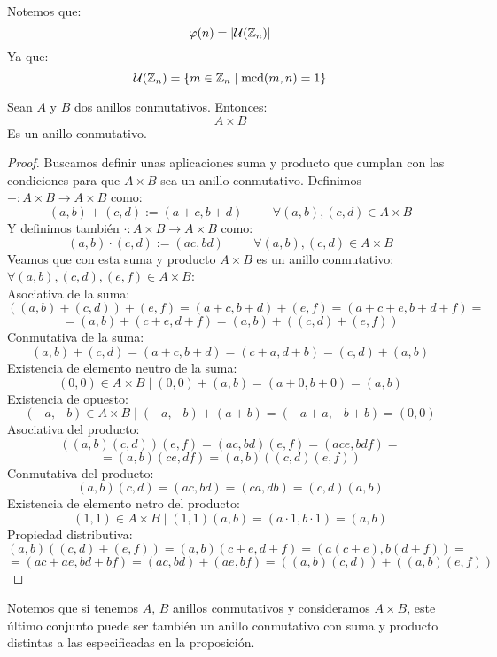 \bigskip

Notemos que:
$$\varphi(n) = |\mathcal{U}(\mathbb Z_n)|$$
Ya que:
$$\mathcal{U}(\mathbb Z_n) = \{m \in \mathbb Z_n \mid \operatorname{mcd}(m,n) = 1\}$$

\begin{prop}
    Sean $A$ y $B$ dos anillos conmutativos. Entonces:
    $$A \times B$$
    Es un anillo conmutativo.
\begin{proof}
    Buscamos definir unas aplicaciones suma y producto que cumplan con las condiciones para que $A \times B$ sea un anillo
    conmutativo.\newline
    Definimos $+:A\times B\rightarrow A\times B$ como:
    $$(a,b)+(c,d) := (a+c,b+d)\hspace{1cm}\forall (a,b),(c,d) \in A\times B$$
    Y definimos también $\cdot:A\times B\rightarrow A\times B$ como:
    $$(a,b)\cdot(c,d) := (ac, bd)\hspace{1cm}\forall (a,b),(c,d) \in A\times B$$
    Veamos que con esta suma y producto $A\times B$ es un anillo conmutativo: $\forall (a,b),(c,d),(e,f) \in A \times B$:\\

    
    Asociativa de la suma:
    $$((a,b)+(c,d))+(e,f) = (a+c,b+d)+(e,f) = (a+c+e,b+d+f) =$$
    $$=(a,b) + (c+e,d+f) = (a,b) + ((c,d)+(e,f))$$
    Conmutativa de la suma:
    $$(a,b)+(c,d) = (a+c,b+d) = (c+a,d+b) = (c,d)+(a,b)$$
    Existencia de elemento neutro de la suma:
    $$(0,0) \in A\times B \mid (0,0)+(a,b) = (a+0,b+0) = (a,b)$$
    Existencia de opuesto:
    $$(-a,-b) \in A\times B \mid (-a,-b)+(a+b) = (-a+a, -b+b) = (0,0)$$
    Asociativa del producto:
    $$((a,b)(c,d))(e,f) = (ac,bd)(e,f) = (ace,bdf) =$$
    $$=(a,b)(ce,df) = (a,b) ((c,d)(e,f))$$
    Conmutativa del producto:
    $$(a,b)(c,d) = (ac,bd) = (ca,db) = (c,d)(a,b)$$
    Existencia de elemento netro del producto:
    $$(1,1) \in A\times B \mid (1,1)(a,b) = (a\cdot 1, b\cdot 1) = (a,b)$$
    Propiedad distributiva:
    $$(a,b)((c,d)+(e,f)) = (a,b)(c+e,d+f) = (a(c+e),b(d+f)) =$$
    $$= (ac+ae,bd+bf) = (ac,bd) + (ae,bf) = ((a,b)(c,d))+((a,b)(e,f))$$
\end{proof}
\end{prop}



Notemos que si tenemos $A$, $B$ anillos conmutativos y consideramos $A\times B$, este último conjunto puede ser también un anillo
conmutativo con suma y producto distintas a las especificadas en la proposición.

